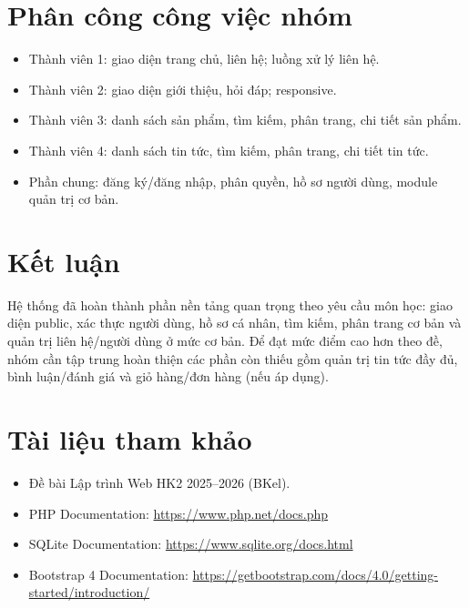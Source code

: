\documentclass[12pt,a4paper]{article}
\begin{document}
\section{Phân công công việc nhóm}
\begin{itemize}
  \item Thành viên 1: giao diện trang chủ, liên hệ; luồng xử lý liên hệ.
  \item Thành viên 2: giao diện giới thiệu, hỏi đáp; responsive.
  \item Thành viên 3: danh sách sản phẩm, tìm kiếm, phân trang, chi tiết sản phẩm.
  \item Thành viên 4: danh sách tin tức, tìm kiếm, phân trang, chi tiết tin tức.
  \item Phần chung: đăng ký/đăng nhập, phân quyền, hồ sơ người dùng, module quản trị cơ bản.
\end{itemize}

\section{Kết luận}
Hệ thống đã hoàn thành phần nền tảng quan trọng theo yêu cầu môn học: giao diện public, xác thực người dùng, hồ sơ cá nhân, tìm kiếm, phân trang cơ bản và quản trị liên hệ/người dùng ở mức cơ bản. Để đạt mức điểm cao hơn theo đề, nhóm cần tập trung hoàn thiện các phần còn thiếu gồm quản trị tin tức đầy đủ, bình luận/đánh giá và giỏ hàng/đơn hàng (nếu áp dụng).

\section*{Tài liệu tham khảo}
\begin{itemize}
  \item Đề bài Lập trình Web HK2 2025--2026 (BKel).
  \item PHP Documentation: \url{https://www.php.net/docs.php}
  \item SQLite Documentation: \url{https://www.sqlite.org/docs.html}
  \item Bootstrap 4 Documentation: \url{https://getbootstrap.com/docs/4.0/getting-started/introduction/}
\end{itemize}
\end{document}
